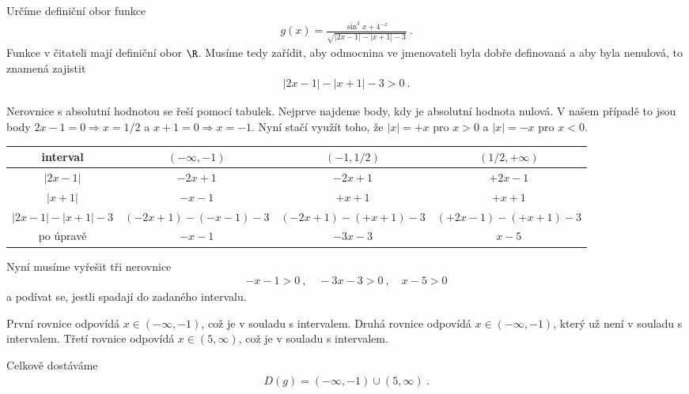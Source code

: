 \begin{example}
    Určíme definiční obor funkce \begin{align}
        g(x) = \frac{\sin^3 x + 4^{-x}}{\sqrt{|2x-1|-|x+1|-3}} \:.
    \end{align}
    Funkce v čitateli mají definiční obor $\R$. Musíme tedy zařídit, aby odmocnina ve jmenovateli byla dobře definovaná a aby byla nenulová, to znamená zajistit \begin{align}
        |2x-1|-|x+1|-3 > 0 \:.
    \end{align}

    Nerovnice s absolutní hodnotou se řeší pomocí tabulek. Nejprve najdeme body, kdy je absolutní hodnota nulová. V našem případě to jsou body $2x-1 = 0 \Rightarrow x=1/2$ a $x+1=0 \Rightarrow x=-1$. Nyní stačí využít toho, že $|x| = +x$ pro $x>0$ a $|x| = -x$ pro $x<0$.

    \begin{table}[H]
        \centering
        \begin{tabular}{c||c|c|c}
            interval & $(-\infty,-1)$ & $(-1,1/2)$ & $(1/2, +\infty)$ \\
            \hline
            $|2x-1|$ & $-2x+1$ & $-2x+1$ & $+2x-1$ \\
            \hline
            $|x+1|$ & $-x-1$ & $+x+1$ & $+x+1$ \\
            \hline \hline
            $|2x-1|-|x+1|-3$ & $(-2x+1)-(-x-1)-3$ & $(-2x+1)-(+x+1)-3$ & $(+2x-1)-(+x+1)-3$ \\
            \hline
            po úpravě & $-x-1$ & $ -3x - 3$ & $x-5$   
        \end{tabular}
    \end{table}
    Nyní musíme vyřešit tři nerovnice \begin{align}
        -x-1>0 \:, \quad -3x -3 >0 \:, \quad x-5 > 0 
    \end{align}
    a podívat se, jestli spadají do zadaného intervalu.

    První rovnice odpovídá $x \in (-\infty,-1)$, což je v souladu s intervalem.
    Druhá rovnice odpovídá $x \in (-\infty,-1)$, který už není v souladu s intervalem.
    Třetí rovnice odpovídá $x \in (5, \infty)$, což je v souladu s intervalem.

    Celkově dostáváme 
    \begin{align}
        \boxed{ D(g) = (-\infty, -1) \cup (5, \infty) } \:.
    \end{align}
\end{example}
